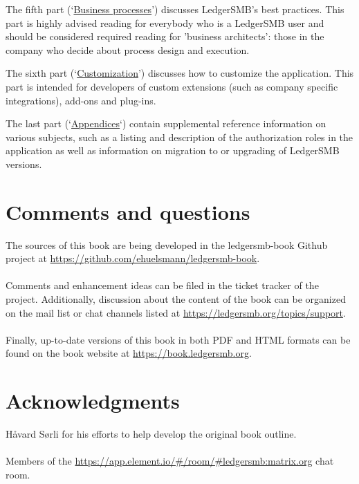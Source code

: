 \documentclass[10pt,a4paper]{book}
\begin{document}
The fifth part (\lq\hyperref[part-business-processes]{Business processes}\rq) discusses LedgerSMB's best practices. 
This part is highly advised
reading for everybody who is a LedgerSMB user and should be considered required reading for 'business
architects': those in the company who decide about process design and execution.

The sixth part (\lq\hyperref[part-customization]{Customization}\rq) discusses how to customize the application. 
This part is intended for developers of
custom extensions (such as company specific integrations), add-ons and plug-ins.

The last part (\lq\hyperref[part-appendices]{Appendices}\lq) contain supplemental reference information on various subjects, 
such as a listing and description
of the authorization roles in the application as well as information on migration to or upgrading of
LedgerSMB versions.


\section*{Comments and questions}
\label{sec-comments}

The sources of this book are being developed in the ledgersmb-book Github project at
\url{https://github.com/ehuelsmann/ledgersmb-book}. \\
~ \\
Comments and enhancement ideas can be filed
in the ticket tracker of the project. Additionally, discussion about the content of the book
can be organized on the mail list or chat channels listed  at \url{https://ledgersmb.org/topics/support}.\\
~ \\
Finally, up-to-date versions of this book in both PDF and HTML formats can be found on the book website at \url{https://book.ledgersmb.org}.


\section*{Acknowledgments}
\label{sec-acknowledgements}

H{\aa}vard S{\o}rli for his efforts to help develop the original book outline.\\
~ \\
Members of the \url{https://app.element.io/#/room/#ledgersmb:matrix.org}  chat room.










\clearpage
{}
\printglossary[type=acronym]

\clearpage
{}
\printglossary


\clearpage
{}
\printindex
\end{document}

